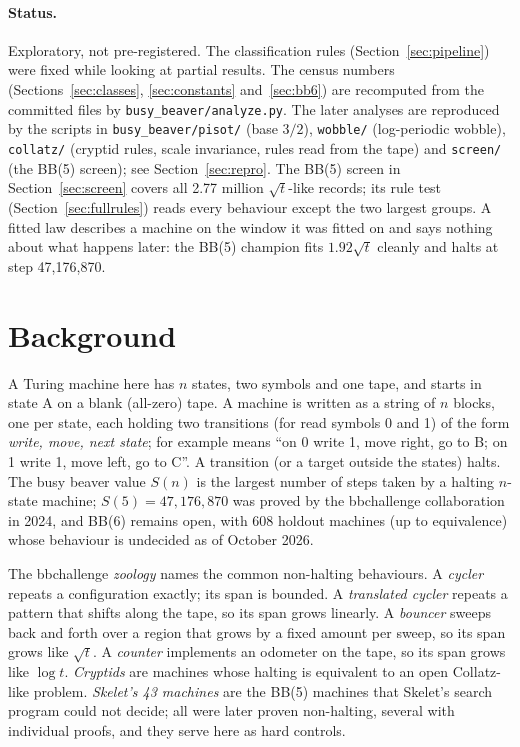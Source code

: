 \documentclass[11pt,a4paper]{article}
\newcommand{\tm}[1]{\texttt{\detokenize{#1}}}   %
\newcommand{\BB}[1]{BB(#1)}
\begin{document}
\paragraph{Status.} Exploratory, not pre-registered. The classification rules
(Section~\ref{sec:pipeline}) were fixed while looking at partial results. The census numbers
(Sections~\ref{sec:classes}, \ref{sec:constants} and~\ref{sec:bb6}) are recomputed from the committed
files by \texttt{busy\_beaver/analyze.py}. The later analyses are reproduced by the scripts in
\texttt{busy\_beaver/pisot/} (base $3/2$), \texttt{wobble/} (log-periodic wobble), \texttt{collatz/}
(cryptid rules, scale invariance, rules read from the tape) and \texttt{screen/} (the \BB{5}
screen); see Section~\ref{sec:repro}. The \BB{5} screen in Section~\ref{sec:screen} covers all 2.77 million
$\sqrt t$-like records; its rule test (Section~\ref{sec:fullrules}) reads every behaviour except the
two largest groups. A fitted
law describes a machine on the window it was fitted on and says nothing about what happens later:
the \BB{5} champion fits $1.92\sqrt t$ cleanly and halts at step 47,176,870.

\tableofcontents

\section{Background}

A Turing machine here has $n$ states, two symbols and one tape, and starts in state A on a blank
(all-zero) tape. A machine is written as a string of $n$ blocks, one per state, each holding
two transitions (for read symbols 0 and 1) of the form \emph{write, move, next state}; for
example \tm{1RB1LC} means ``on 0 write 1, move right, go to B; on 1 write 1, move left, go to C''.
A transition \tm{---} (or a target outside the states) halts. The busy beaver value $S(n)$ is
the largest number of steps taken by a halting $n$-state machine; $S(5) = 47{,}176{,}870$ was
proved by the bbchallenge collaboration in 2024, and \BB{6} remains open, with 608 holdout
machines (up to equivalence) whose behaviour is undecided as of October 2026.

The bbchallenge \emph{zoology} names the common non-halting behaviours. A \emph{cycler} repeats a
configuration exactly; its span is bounded. A \emph{translated cycler} repeats a pattern that
shifts along the tape, so its span grows linearly. A \emph{bouncer} sweeps back and forth over a
region that grows by a fixed amount per sweep, so its span grows like $\sqrt t$. A \emph{counter}
implements an odometer on the tape, so its span grows like $\log t$. \emph{Cryptids} are machines
whose halting is equivalent to an open Collatz-like problem. \emph{Skelet's 43 machines} are the
\BB{5} machines that Skelet's search program could not decide; all were later proven non-halting,
several with individual proofs, and they serve here as hard controls.
\end{document}
